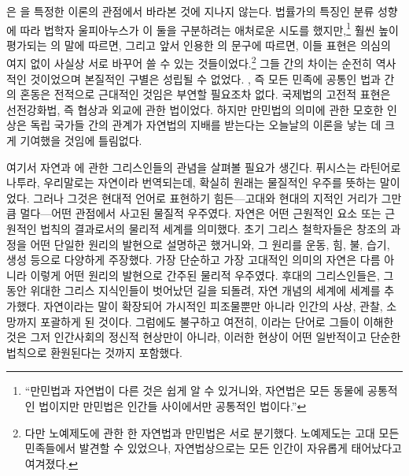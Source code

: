 은 을 특정한 이론의 관점에서 바라본 것에
지나지 않는다.
법률가의 특징인 분류 성향에 따라
법학자 울피아누스가
이 둘을 구분하려는 애처로운 시도를 했지만,\footnote{%
  ``만민법과 자연법이 다른 것은 쉽게 알 수 있거니와,
  자연법은 모든 동물에 공통적인 법이지만 만민법은 인간들 사이에서만
  공통적인 법이다.'' }
훨씬 높이 평가되는 의 말에 따르면, 그리고
앞서 인용한 의 문구에 따르면,
이들 표현은 의심의 여지 없이 사실상 서로 바꾸어 쓸 수 있는
것들이었다.\footnote{%
  다만 노예제도에 관한 한 자연법과 만민법은
  서로 분기했다. 노예제도는 고대 모든 민족들에서 발견할 수 있었으나,
  자연법상으로는 모든 인간이 자유롭게 태어났다고 여겨졌다. }
그들 간의 차이는 순전히 역사적인 것이었으며
본질적인 구별은 성립될 수 없었다.
, 즉 모든 민족에 공통인 법과
 간의 혼동은 전적으로 근대적인 것임은
부연할 필요조차 없다.
국제법의 고전적 표현은
선전강화법,
즉 협상과 외교에 관한 법이었다.
하지만 만민법의 의미에 관한 모호한 인상은
독립 국가들 간의 관계가 자연법의 지배를 받는다는 오늘날의 이론을
낳는 데 크게 기여했을 것임에 틀림없다.

여기서
자연과 에 관한 그리스인들의 관념을 살펴볼 필요가 생긴다.
퓌시스는 라틴어로 나투라, 우리말로는
자연이라 번역되는데,
확실히 원래는 물질적인 우주를 뜻하는 말이었다.
그러나 그것은 현대적 언어로 표현하기 힘든---고대와 현대의 지적인 거리가
그만큼 멀다---어떤 관점에서 사고된
물질적 우주였다.
자연은 어떤 근원적인 요소 또는 근원적인 법칙의 결과로서의
물리적 세계를 의미했다.
초기 그리스 철학자들은
창조의 과정을 어떤 단일한 원리의 발현으로 설명하곤 했거니와,
그 원리를 운동, 힘, 불, 습기, 생성 등으로 다양하게 주장했다.
가장 단순하고 가장 고대적인 의미의 자연은 다름 아니라
이렇게 어떤 원리의 발현으로
간주된 물리적 우주였다.
후대의 그리스인들은, 그동안 위대한 그리스 지식인들이 벗어났던 길을 되돌려,
자연 개념의  세계에  세계를 추가했다.
자연이라는 말이 확장되어 가시적인 피조물뿐만 아니라 인간의 사상, 관찰, 소망까지
포괄하게 된 것이다.
그럼에도 불구하고 여전히, 이라는 단어로 그들이 이해한 것은
그저 인간사회의 정신적 현상만이 아니라,
이러한 현상이 어떤 일반적이고 단순한 법칙으로 환원된다는 것까지 포함했다.

